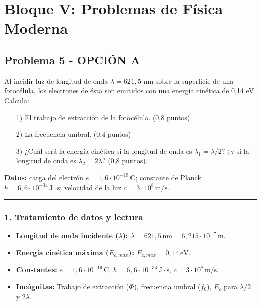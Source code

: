 \newpage

\section{Bloque V: Problemas de Física Moderna}
\label{sec:moderna_2009_jun_ord}

\subsection{Problema 5 - OPCIÓN A}
\label{subsec:5A_2009_jun_ord}

\begin{cajaenunciado}
Al incidir luz de longitud de onda $\lambda=621,5$ nm sobre la superficie de una fotocélula, los electrones de ésta son emitidos con una energía cinética de 0,14 eV. Calcula:
\begin{enumerate}
    \item[1)] El trabajo de extracción de la fotocélula. (0,8 puntos)
    \item[2)] La frecuencia umbral. (0,4 puntos)
    \item[3)] ¿Cuál será la energía cinética si la longitud de onda es $\lambda_{1}=\lambda/2$? ¿y si la longitud de onda es $\lambda_{2}=2\lambda$? (0,8 puntos).
\end{enumerate}
\textbf{Datos:} carga del electrón $e=1,6\cdot10^{-19}\,\text{C}$; constante de Planck $h=6,6\cdot10^{-34}\,\text{J}\cdot\text{s}$; velocidad de la luz $c=3\cdot10^{8}\,\text{m/s}$.
\end{cajaenunciado}
\hrule

\subsubsection*{1. Tratamiento de datos y lectura}
\begin{itemize}
    \item \textbf{Longitud de onda incidente ($\lambda$):} $\lambda = 621,5 \, \text{nm} = 6,215 \cdot 10^{-7} \, \text{m}$.
    \item \textbf{Energía cinética máxima ($E_{c,max}$):} $E_{c,max} = 0,14 \, \text{eV}$.
    \item \textbf{Constantes:} $e=1,6\cdot10^{-19}\,\text{C}$, $h=6,6\cdot10^{-34}\,\text{J}\cdot\text{s}$, $c=3\cdot10^{8}\,\text{m/s}$.
    \item \textbf{Incógnitas:} Trabajo de extracción ($\Phi$), frecuencia umbral ($f_0$), $E_c$ para $\lambda/2$ y $2\lambda$.
\end{itemize}

